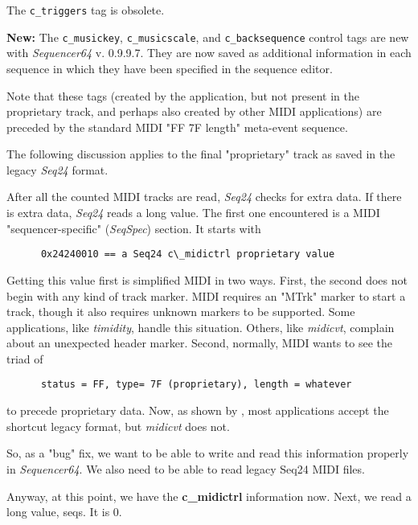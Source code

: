    The \texttt{c\_triggers} tag is obsolete.

   \textbf{New:}
   The \texttt{c\_musickey},
   \texttt{c\_musicscale}, and
   \texttt{c\_backsequence}
   control tags are new with \textsl{Sequencer64} v. 0.9.9.7.
   They are now saved as additional information in each sequence in which they
   have been specified in the sequence editor.

   Note that these tags (created by the application, but not present in the
   proprietary track, and perhaps also created by other MIDI applications) are
   preceded by the standard MIDI "FF 7F length" meta-event sequence.

   The following discussion applies to the final "proprietary" track as
   saved in the legacy \textsl{Seq24} format.

   After all the counted MIDI tracks are read, \textsl{Seq24} checks for
   extra data.  If there is extra data, \textsl{Seq24} reads a long value.
   The first one encountered is a MIDI "sequencer-specific"
   (\textsl{SeqSpec}) section.  It starts with

   \begin{verbatim}
      0x24240010 == a Seq24 c\_midictrl proprietary value
   \end{verbatim}

   Getting this value first is simplified MIDI in two ways.
   First, the second does not begin with any kind of track marker.  MIDI
   requires an "MTrk" marker to start a track, though it also requires
   unknown markers to be supported.  Some applications, like
   \textsl{timidity}, handle this situation.  Others, like \textsl{midicvt},
   complain about an unexpected header marker.
   Second, normally, MIDI wants to see the triad of

   \begin{verbatim}
      status = FF, type= 7F (proprietary), length = whatever
   \end{verbatim}

   to precede proprietary data.
   Now, as shown by ,
   most applications accept the shortcut legacy format, but \textsl{midicvt}
   does not.

   So, as a "bug" fix, we want to be able to write and read
   this information properly in \textsl{Sequencer64}.
   We also need to be able to read legacy Seq24 MIDI files.

   Anyway, at this point, we have the \textbf{c\_midictrl} information now.
   Next, we read a long value, seqs.  It is 0.

